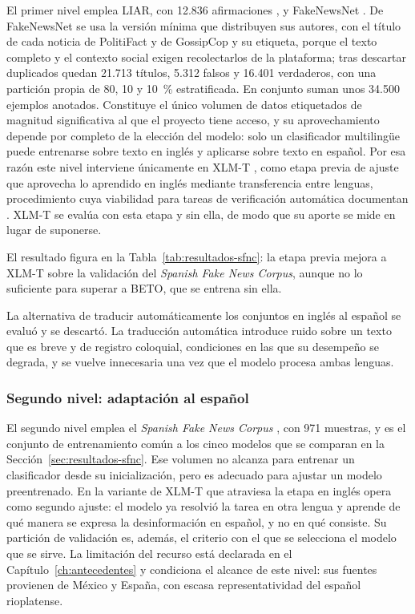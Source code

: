 El primer nivel emplea LIAR, con 12.836 afirmaciones \parencite{Wang2017}, y FakeNewsNet \parencite{ShuEtAl2020}. De FakeNewsNet se usa la versión mínima que distribuyen sus autores, con el título de cada noticia de PolitiFact y de GossipCop y su etiqueta, porque el texto completo y el contexto social exigen recolectarlos de la plataforma; tras descartar duplicados quedan 21.713 títulos, 5.312 falsos y 16.401 verdaderos, con una partición propia de 80, 10 y 10~\% estratificada. En conjunto suman unos 34.500 ejemplos anotados. Constituye el único volumen de datos etiquetados de magnitud significativa al que el proyecto tiene acceso, y su aprovechamiento depende por completo de la elección del modelo: solo un clasificador multilingüe puede entrenarse sobre texto en inglés y aplicarse sobre texto en español. Por esa razón este nivel interviene únicamente en XLM-T \parencite{BarbieriEtAl2022}, como etapa previa de ajuste que aprovecha lo aprendido en inglés mediante transferencia entre lenguas, procedimiento cuya viabilidad para tareas de verificación automática documentan \textcite{DrzchalEtAl2024}. XLM-T se evalúa con esta etapa y sin ella, de modo que su aporte se mide en lugar de suponerse.

El resultado figura en la Tabla~\ref{tab:resultados-sfnc}: la etapa previa mejora a XLM-T sobre la validación del \textit{Spanish Fake News Corpus}, aunque no lo suficiente para superar a BETO, que se entrena sin ella.

La alternativa de traducir automáticamente los conjuntos en inglés al español se evaluó y se descartó. La traducción automática introduce ruido sobre un texto que es breve y de registro coloquial, condiciones en las que su desempeño se degrada, y se vuelve innecesaria una vez que el modelo procesa ambas lenguas.

\subsubsection{Segundo nivel: adaptación al español}

El segundo nivel emplea el \textit{Spanish Fake News Corpus} \parencite{PosadasEtAl2019}, con 971 muestras, y es el conjunto de entrenamiento común a los cinco modelos que se comparan en la Sección~\ref{sec:resultados-sfnc}. Ese volumen no alcanza para entrenar un clasificador desde su inicialización, pero es adecuado para ajustar un modelo preentrenado. En la variante de XLM-T que atraviesa la etapa en inglés opera como segundo ajuste: el modelo ya resolvió la tarea en otra lengua y aprende de qué manera se expresa la desinformación en español, y no en qué consiste. Su partición de validación es, además, el criterio con el que se selecciona el modelo que se sirve. La limitación del recurso está declarada en el Capítulo~\ref{ch:antecedentes} y condiciona el alcance de este nivel: sus fuentes provienen de México y España, con escasa representatividad del español rioplatense.

